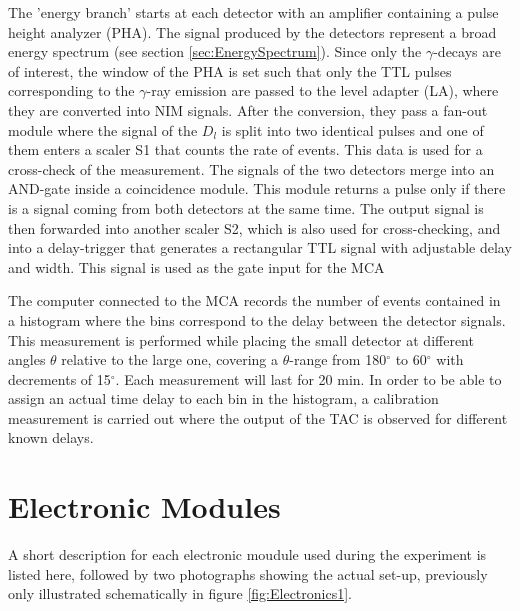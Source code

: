\documentclass[a4paper,parskip,11pt, DIV12]{scrreprt}
\begin{document}
 The 'energy branch' starts at each detector with an amplifier containing a pulse height analyzer (PHA). The signal produced by the detectors represent a broad energy spectrum (see section \ref{sec:EnergySpectrum}). Since only the $\gamma$-decays are of interest, the window of the PHA is set such that only the TTL pulses corresponding to the $\gamma$-ray emission are passed to the level adapter (LA), where they are converted into NIM signals. After the conversion, they pass a fan-out module where the signal of the $D_l$ is split into two identical pulses and one of them enters a scaler S1 that counts the rate of events. This data is used for a cross-check of the measurement. The signals of the two detectors merge into an AND-gate inside a coincidence module. This module returns a pulse only if there is a signal coming from both detectors at the same time. The output signal is then forwarded into another scaler S2, which is also used for cross-checking, and into a delay-trigger that generates a rectangular TTL signal with adjustable delay and width. This signal is used as the gate input for the MCA

The computer connected to the MCA records the number of events contained in a histogram where the bins correspond to the delay between the detector signals. This measurement is performed while placing the small detector at different angles $\theta$ relative to the large one, covering a $\theta$-range from 180$^\circ$ to 60$^\circ$ with decrements of 15$^\circ$. Each measurement will last for 20 min. In order to be able to assign an actual time delay to each bin in the histogram, a calibration measurement is carried out where the output of the TAC is observed for different known delays. 


\section{Electronic Modules}

A short description for each electronic moudule used during the experiment is listed here, followed by two photographs showing the actual set-up, previously only illustrated schematically in figure \ref{fig:Electronics1}.
\end{document}
